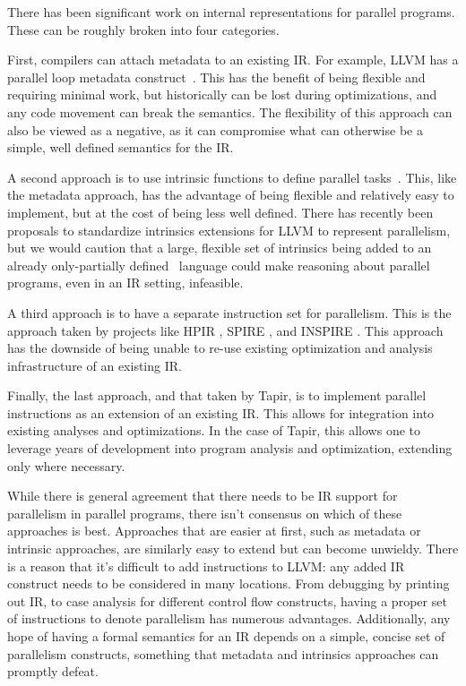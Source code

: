 \documentclass[sigconf]{acmart}
\begin{document}
There has been significant work on internal representations for parallel
programs. These can be roughly broken into four categories.

First, compilers can attach metadata to an existing IR. For example, LLVM has a
parallel loop metadata construct~\cite{llvmref}. This has the benefit of being
flexible and requiring minimal work, but historically can be lost during
optimizations, and any code movement can break the semantics. The flexibility
of this approach can also be viewed as a negative, as it can compromise
what can otherwise be a simple, well defined semantics for the IR.

A second approach is to use intrinsic functions to define parallel tasks~\cite{ares}.
This, like the metadata approach, has the advantage of being
flexible and relatively easy to implement, but at the cost of being less well
defined. There has recently been proposals to standardize intrinsics extensions
for LLVM to represent parallelism, but we would caution that a large, flexible
set of intrinsics being added to an already only-partially defined~\cite{verillvm} language could make reasoning about parallel programs, even
in an IR setting, infeasible.

A third approach is to have a separate instruction set for parallelism. This is
the approach taken by projects like HPIR \cite{zhao2011intermediate}, SPIRE
\cite{khaldi2012spire}, and INSPIRE \cite{jordan2013inspire}. This approach has
the downside of being unable to re-use existing optimization and analysis
infrastructure of an existing IR.

Finally, the last approach, and that taken by Tapir, is to implement parallel
instructions as an extension of an existing IR. This allows for integration
into existing analyses and optimizations. In the case of Tapir, this allows one
to leverage years of development into program analysis and optimization,
extending only where necessary.

While there is general agreement that there needs to be IR support for
parallelism in parallel programs, there isn't consensus on which of these
approaches is best. Approaches that are easier at first, such as metadata
or intrinsic approaches, are similarly easy to extend but can become unwieldy. There is
a reason that it's difficult to add instructions to LLVM: any added IR
construct needs to be considered in many locations. From debugging by printing
out IR, to case analysis for different control flow constructs, having
a proper set of instructions to denote parallelism has numerous advantages.
Additionally, any hope of having a formal semantics for an IR depends on a
simple, concise set of parallelism constructs, something that metadata and
intrinsics approaches can promptly defeat.
\end{document}
